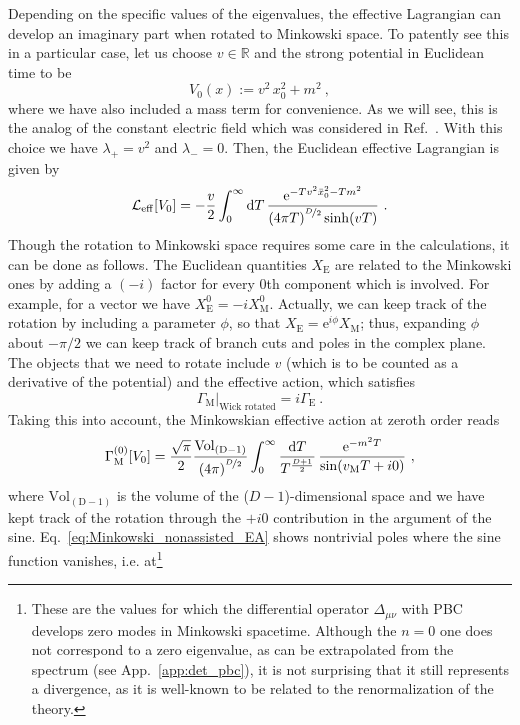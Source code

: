 \documentclass[12pt,a4paper]{article}
\numberwithin{equation}{section}
\numberwithin{equation}{section}
\begin{document}
Depending on the specific values of the eigenvalues, the effective Lagrangian can develop an imaginary part when rotated to Minkowski space. To patently see this in a particular case, let us choose $v\in\mathbb{R}$ and the strong potential in Euclidean time to be
\begin{equation}\label{eq:background_quadratic}
 V_0(x):=v^2 \, x_0^2+m^2\ ,
\end{equation}
where we have also included a mass term for convenience. As we will see, this is the analog of the constant electric field which was considered in Ref.~\cite{Franchino-Vinas:2023wea}. With this choice we have $\lambda_+=v^2$ and $\lambda_-=0$. Then, the Euclidean effective Lagrangian is given by
\begin{equation}
 \mathcal{L}_{\mathrm{eff}}[V_0]=-\frac{v}{2} \int_0^{\infty} {{ \rm d} T} \, \frac{\mathrm{e}^{-Tv^2\bar{x}_0^2-Tm^2}}{\left( 4\pi T \right)^{\nicefrac{D}{2}} {\sinh(v T)}} \ .
\end{equation}
Though the rotation to Minkowski space requires some care in the calculations, it can be done as follows. The Euclidean quantities $X_{\mathrm{E}}$ are related to the Minkowski ones by adding a $(-i)$ factor for every $0$th component which is involved. For example, for a vector we have $X^0_{\mathrm{E}}=-i X^0_{\mathrm{M}}$. Actually, we can keep track of the rotation by including a parameter $\phi$, so that $X_{\mathrm{E}}=\mathrm{e}^{i\phi} X_{\mathrm{M}}$; thus, expanding $\phi$ about $-\pi/2$ we can keep track of branch cuts and poles in the complex plane. The objects that we need to rotate include $v$ (which is to be counted as a derivative of the potential) and the effective action, 
which satisfies
\begin{equation}
 \Gamma_{\mathrm{M}}\Big\vert_{\text{Wick rotated}}=i \Gamma_{\mathrm{E}}\ .
\end{equation}
Taking this into account, the Minkowskian effective action at zeroth order reads
\begin{equation}\label{eq:Minkowski_nonassisted_EA}
 \Gamma^{(0)}_{\mathrm{M}}[V_0]=\frac{ \sqrt{\pi}}{2} \frac{\mathrm{Vol}_{\mathrm{(D-1)}}}{\left( 4\pi\right)^{\nicefrac{D}{2}}} \int_0^{\infty} \frac{{\rm d}T}{T^{\frac{D+1}{2}}} \, \frac{\mathrm{e}^{-m^2 T}}{\sin({v}_{\mathrm{M}} T + i 0)}\ ,
\end{equation}
where $\mathrm{Vol}_{\mathrm{(D-1)}}$ is the volume of the ($D-1$)-dimensional space and we have kept track of the rotation through the $+i 0$ contribution in the argument of the sine. 
Eq.~\eqref{eq:Minkowski_nonassisted_EA} shows nontrivial poles where the sine function vanishes, i.e. at\footnote{These are the values for which the differential operator $\Delta_{\mu\nu}$ with PBC develops zero modes in Minkowski spacetime. Although the $n=0$ one does not correspond to a zero eigenvalue, as can be extrapolated from the spectrum (see App.~\ref{app:det_pbc}), it is not surprising that it still represents a divergence, as it is well-known to be related to the renormalization of the theory.}
\end{document}
